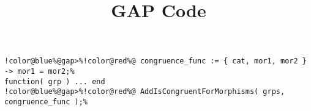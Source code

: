 \documentclass[12pt]{amsart}
\title{GAP Code}
\author{}
\begin{document}
\maketitle

\begin{Verbatim}[commandchars=!@\%,frame=single]
!color@blue%@gap>%!color@red%@ congruence_func := { cat, mor1, mor2 } -> mor1 = mor2;%
function( grp ) ... end
!color@blue%@gap>%!color@red%@ AddIsCongruentForMorphisms( grps, congruence_func );%
\end{Verbatim}
\end{document}
